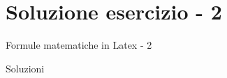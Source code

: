 \section{Soluzione esercizio - 2}
  \begin{frame}{Formule matematiche in Latex - 2}

    \begin{exampleblock}{Soluzioni}
      
    \end{exampleblock}

\end{frame}
